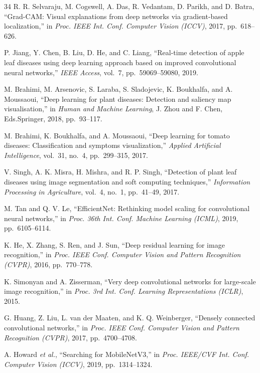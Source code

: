 \documentclass[conference]{IEEEtran}
\begin{document}
\begin{thebibliography}{34}
R. R. Selvaraju, M. Cogswell, A. Das, R. Vedantam, D. Parikh, and D. Batra, ``Grad-CAM: Visual explanations from deep networks via gradient-based localization,'' in \textit{Proc. IEEE Int. Conf. Computer Vision (ICCV)}, 2017, pp.~618--626.

P. Jiang, Y. Chen, B. Liu, D. He, and C. Liang, ``Real-time detection of apple leaf diseases using deep learning approach based on improved convolutional neural networks,'' \textit{IEEE Access}, vol.~7, pp.~59069--59080, 2019.

M. Brahimi, M. Arsenovic, S. Laraba, S. Sladojevic, K. Boukhalfa, and A. Moussaoui, ``Deep learning for plant diseases: Detection and saliency map visualisation,'' in \textit{Human and Machine Learning}, J. Zhou and F. Chen, Eds.\@ Springer, 2018, pp.~93--117.

M. Brahimi, K. Boukhalfa, and A. Moussaoui, ``Deep learning for tomato diseases: Classification and symptoms visualization,'' \textit{Applied Artificial Intelligence}, vol.~31, no.~4, pp.~299--315, 2017.

V. Singh, A. K. Misra, H. Mishra, and R. P. Singh, ``Detection of plant leaf diseases using image segmentation and soft computing techniques,'' \textit{Information Processing in Agriculture}, vol.~4, no.~1, pp.~41--49, 2017.

M. Tan and Q. V. Le, ``EfficientNet: Rethinking model scaling for convolutional neural networks,'' in \textit{Proc. 36th Int. Conf. Machine Learning (ICML)}, 2019, pp.~6105--6114.

K. He, X. Zhang, S. Ren, and J. Sun, ``Deep residual learning for image recognition,'' in \textit{Proc. IEEE Conf. Computer Vision and Pattern Recognition (CVPR)}, 2016, pp.~770--778.

K. Simonyan and A. Zisserman, ``Very deep convolutional networks for large-scale image recognition,'' in \textit{Proc. 3rd Int. Conf. Learning Representations (ICLR)}, 2015.

G. Huang, Z. Liu, L. van der Maaten, and K. Q. Weinberger, ``Densely connected convolutional networks,'' in \textit{Proc. IEEE Conf. Computer Vision and Pattern Recognition (CVPR)}, 2017, pp.~4700--4708.

A. Howard \textit{et al.}, ``Searching for MobileNetV3,'' in \textit{Proc. IEEE/CVF Int. Conf. Computer Vision (ICCV)}, 2019, pp.~1314--1324.


\end{thebibliography}
\end{document}
